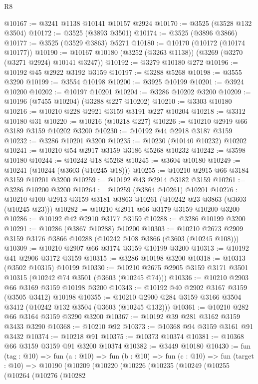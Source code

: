 \begin{lexlean}{R8}
\begin{coremodule}
@10167 := @3241 @1138 @10141 @10157 @2924
@10170 := @3525 (@3528 @132 @3504)
@10172 := @3525 (@3893 @3501)
@10174 := @3525 (@3896 @3866)
@10177 := @3525 (@3529 @3863) @5271
@10180 := @10170 (@10172 (@10174 @10177))
@10190 := @10167 @10180 (@3252 (@3263 @1138)) (@3269 (@3270 (@3271 @2924) @10141 @3247))
@10192 := @3279 @10180 @272
@10196 := @10192 @45 @2922 @3192 @3159
@10197 := @3288 @5268
@10198 := @3555 @3290
@10199 := @3554 @10198
@10200 := @3925 @10199
@10201 := @3924 @10200
@10202 := @10197 @10201
@10204 := @3286 @10202 @3200
@10209 := @10196 (@7455 @10204) (@3288 @227 @10202)
@10210 := @3303 @10180
@10216 := @10210 @228 @2921 @3159 @3191 @227 @10204
@10218 := @3312 @10180 @31
@10220 := @10216 (@10218 @227)
@10226 := @10210 @2919 @66 @3189 @3159 @10202 @3200
@10230 := @10192 @44 @2918 @3187 @3159
@10232 := @3286 @10201 @3200
@10235 := @10230 (@10140 @10232) @10202
@10241 := @10210 @54 @2917 @3159 @3186 @5268 @10232
@10242 := @3598 @10180
@10244 := @10242 @18 @5268
@10245 := @3604 @10180
@10249 := @10241 (@10244 (@3603 (@10245 @18)))
@10255 := @10210 @2915 @66 @3184 @3159 @10201 @3200
@10259 := @10192 @43 @2914 @3182 @3159
@10261 := @3286 @10200 @3200
@10264 := @10259 (@3864 @10261) @10201
@10276 := @10210 @100 @2913 @3159 @3181 @3863 @10261 (@10242 @23 @3863 (@3603 (@10245 @23)))
@10282 := @10210 @2911 @66 @3179 @3159 @10200 @3200
@10286 := @10192 @42 @2910 @3177 @3159
@10288 := @3286 @10199 @3200
@10291 := @10286 (@3867 @10288) @10200
@10303 := @10210 @2673 @2909 @3159 @3176 @3866 @10288 (@10242 @108 @3866 (@3603 (@10245 @108)))
@10309 := @10210 @2907 @66 @3174 @3159 @10199 @3200
@10313 := @10192 @41 @2906 @3172 @3159
@10315 := @3286 @10198 @3200
@10318 := @10313 (@3502 @10315) @10199
@10330 := @10210 @2675 @2905 @3159 @3171 @3501 @10315 (@10242 @74 @3501 (@3603 (@10245 @74)))
@10336 := @10210 @2903 @66 @3169 @3159 @10198 @3200
@10343 := @10192 @40 @2902 @3167 @3159 (@3505 @3412) @10198
@10355 := @10210 @2900 @284 @3159 @3166 @3504 @3412 (@10242 @132 @3504 (@3603 (@10245 @132)))
@10361 := @10210 @282 @66 @3164 @3159 @3290 @3200
@10367 := @10192 @39 @281 @3162 @3159 @3433 @3290
@10368 := @10210 @92
@10373 := @10368 @94 @3159 @3161 @91 @3432
@10374 := @10218 @91
@10375 := @10373 @10374
@10381 := @10368 @66 @3159 @3159 @91 @3200 @10374
@10382 := @3449 @10180
@10430 := fun (tag : @10) =>
  fun (a : @10) =>
  fun (b : @10) =>
  fun (c : @10) =>
  fun (target : @10) =>
  @10190
    (@10209
      (@10220
        (@10226
          (@10235
            (@10249
              (@10255
                (@10264
                  (@10276
                    (@10282

\end{coremodule}
\end{lexlean}
